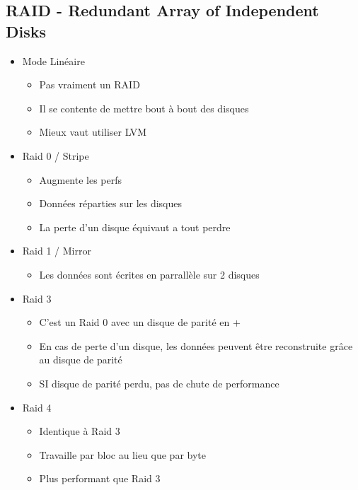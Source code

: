 \documentclass[a4paper]{article}
\begin{document}
      \subsection{RAID - Redundant Array of Independent Disks}
      \begin{itemize}[label=\textbullet, font=\Large]
        \item Mode Linéaire 
        \begin{itemize}[label=, font=\scriptsize] 
          \item Pas vraiment un RAID
          \item Il se contente de mettre bout à bout des disques
          \item Mieux vaut utiliser LVM
        \end{itemize}
        \item Raid 0 / Stripe
        \begin{itemize}[label=, font=\scriptsize] 
          \item Augmente les perfs
          \item Données réparties sur les disques
          \item La perte d'un disque équivaut a tout perdre
        \end{itemize}
        \item Raid 1 / Mirror
        \begin{itemize}[label=, font=\scriptsize] 
          \item Les données sont écrites en parrallèle sur 2 disques
        \end{itemize}
        \item Raid 3
        \begin{itemize}[label=, font=\scriptsize] 
          \item C'est un Raid 0 avec un disque de parité en +
          \item En cas de perte d'un disque, les données peuvent être reconstruite grâce au disque de parité
          \item SI disque de parité perdu, pas de chute de performance
        \end{itemize}
        \item Raid 4
        \begin{itemize}[label=, font=\scriptsize] 
          \item Identique à Raid 3
          \item Travaille par bloc au lieu que par byte
          \item Plus performant que Raid 3

\end{itemize}
\end{itemize}
\end{document}
